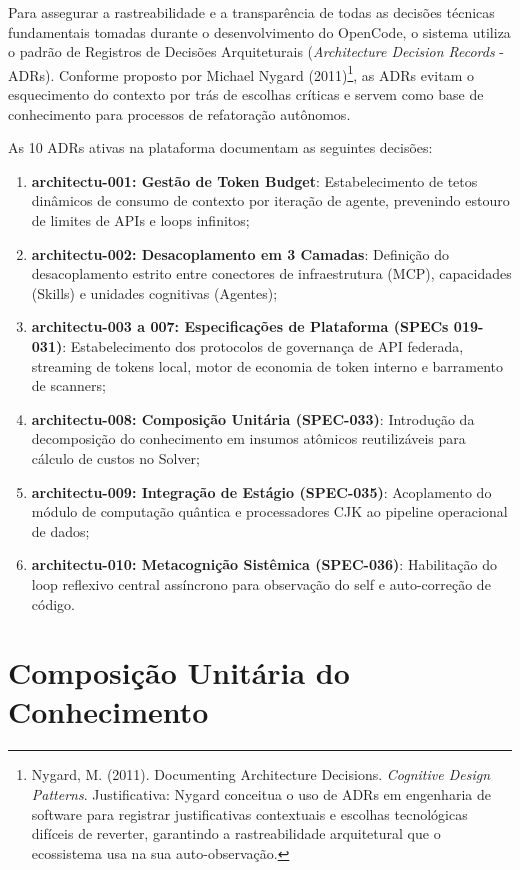 \documentclass[12pt,a4paper,oneside]{abntex2}
\begin{document}
Para assegurar a rastreabilidade e a transparência de todas as decisões técnicas fundamentais tomadas durante o desenvolvimento do OpenCode, o sistema utiliza o padrão de Registros de Decisões Arquiteturais (\textit{Architecture Decision Records} - ADRs). Conforme proposto por Michael Nygard (2011)\footnote{Nygard, M. (2011). Documenting Architecture Decisions. \textit{Cognitive Design Patterns}. Justificativa: Nygard conceitua o uso de ADRs em engenharia de software para registrar justificativas contextuais e escolhas tecnológicas difíceis de reverter, garantindo a rastreabilidade arquitetural que o ecossistema usa na sua auto-observação.}, as ADRs evitam o esquecimento do contexto por trás de escolhas críticas e servem como base de conhecimento para processos de refatoração autônomos.

As 10 ADRs ativas na plataforma documentam as seguintes decisões:

\begin{enumerate}
    \item \textbf{architectu-001: Gestão de Token Budget}: Estabelecimento de tetos dinâmicos de consumo de contexto por iteração de agente, prevenindo estouro de limites de APIs e loops infinitos;
    \item \textbf{architectu-002: Desacoplamento em 3 Camadas}: Definição do desacoplamento estrito entre conectores de infraestrutura (MCP), capacidades (Skills) e unidades cognitivas (Agentes);
    \item \textbf{architectu-003 a 007: Especificações de Plataforma (SPECs 019-031)}: Estabelecimento dos protocolos de governança de API federada, streaming de tokens local, motor de economia de token interno e barramento de scanners;
    \item \textbf{architectu-008: Composição Unitária (SPEC-033)}: Introdução da decomposição do conhecimento em insumos atômicos reutilizáveis para cálculo de custos no Solver;
    \item \textbf{architectu-009: Integração de Estágio (SPEC-035)}: Acoplamento do módulo de computação quântica e processadores CJK ao pipeline operacional de dados;
    \item \textbf{architectu-010: Metacognição Sistêmica (SPEC-036)}: Habilitação do loop reflexivo central assíncrono para observação do self e auto-correção de código.
\end{enumerate}

\chapter{Composição Unitária do Conhecimento}
\label{ch:composicao}
\end{document}
